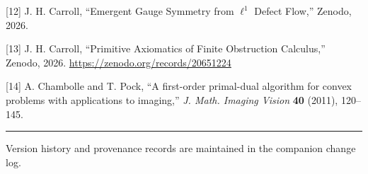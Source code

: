 \documentclass[
]{article}
\begin{document}
{[}12{]} J. H. Carroll, ``Emergent Gauge Symmetry from \(\ell^1\) Defect Flow,'' Zenodo, 2026.

{[}13{]} J. H. Carroll, ``Primitive Axiomatics of Finite Obstruction Calculus,'' Zenodo, 2026. \url{https://zenodo.org/records/20651224}

{[}14{]} A. Chambolle and T. Pock, ``A first-order primal-dual algorithm for convex problems with applications to imaging,'' \emph{J. Math. Imaging Vision} \textbf{40} (2011), 120--145.

\begin{center}\rule{0.5\linewidth}{0.5pt}\end{center}

Version history and provenance records are maintained in the companion change log.
\end{document}
